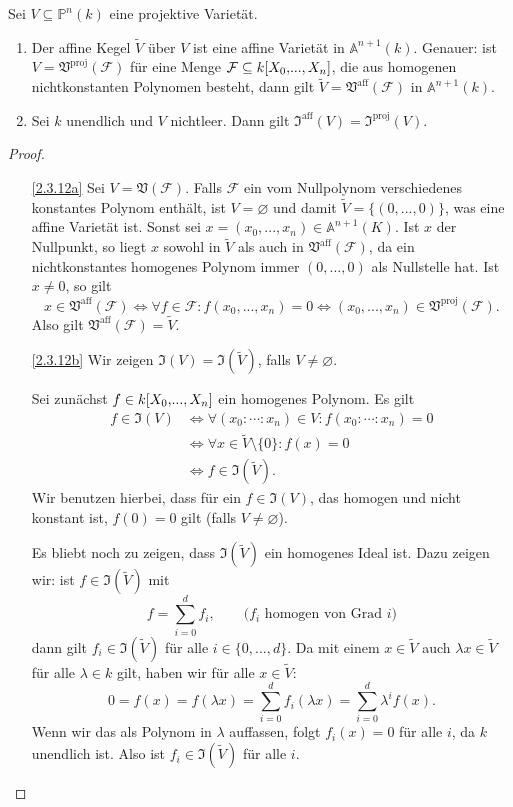\documentclass[a4paper,12pt]{scrbook}
\theoremstyle{keinenummern} %
\theoremstyle{mitnummern}
\theoremstyle{unserbeweis}
\newtheorem{proof}{Beweis}
\def\A{\mathbb{A}}
\def\V{\mathfrak{V}}
\def\I{\mathfrak{I}}
\def\P{\mathbb{P}}
\newcommand{\F}{\mathcal{F}}
\newcommand{\leer}{\ensuremath{\varnothing}}
\renewcommand{\dotsc}{\ensuremath{\!...}}
\newcommand{\ppolyx}[1][n]{\ensuremath%
  [X_{0},\dotsc,X_{#1}]}
\begin{document}
\begin{prop}\label{2.3.12prop}
  Sei $V\subseteq\P^n(k)$ eine projektive Varietät.
  \begin{enumerate}
  \item{} Der affine Kegel $\tilde{V}$ über $V$ ist eine affine Varietät in $\A^{n+1}(k)$. Genauer: ist
    $V=\V^{\mathrm{proj}}(\F)$ für eine Menge $\F\subseteq k\ppolyx$, die aus homogenen nichtkonstanten Polynomen besteht, dann
    gilt $\tilde{V}=\V^{\mathrm{aff}}(\F)$ in $\A^{n+1}(k)$.
  \item{} Sei $k$ unendlich und $V$ nichtleer. Dann gilt $\I^{\mathrm{aff}}(V)=\I^{\mathrm{proj}}(V)$.
  \end{enumerate}
\end{prop}
\begin{proof}
  \begin{enumerate}
  \item[\ref{2.3.12a}] Sei $V=\V(\F)$. Falls $\F$ ein vom Nullpolynom verschiedenes konstantes Polynom enthält, ist $V=\leer$
    und damit $\tilde{V}=\{(0,\dotsc,0)\}$, was eine affine Varietät ist. Sonst sei $x=(x_0,\dotsc,x_n)\in\A^{n+1}(K)$. Ist $x$
    der Nullpunkt, so liegt $x$ sowohl in $\tilde{V}$ als auch in $\V^{\mathrm{aff}}(\F)$, da ein nichtkonstantes homogenes
    Polynom immer $(0,\dotsc,0)$ als Nullstelle hat. Ist $x\neq0$, so gilt
    \[ x\in\V^{\mathrm{aff}}(\F) \iff \forall f\in\F\colon f(x_0,\dotsc,x_n)=0 \iff
    (x_0,\dotsc,x_n)\in\V^{\mathrm{proj}}(\F). \]
    Also gilt $\V^{\mathrm{aff}}(\F)=\tilde{V}$.
  \item[\ref{2.3.12b}] Wir zeigen $\I(V)=\I(\tilde{V})$, falls $V\neq\leer$.

    Sei zunächst $f\in k\ppolyx$ ein homogenes Polynom. Es gilt
    \begin{align*}
      f\in\I(V) &\iff \forall (x_0:\dotsm:x_n)\in V\colon f(x_0:\dotsm:x_n)=0 \\ &\iff \forall x\in\tilde{V}\setminus\{0\}\colon
      f(x)=0 \\ &\iff f\in\I(\tilde{V}).
    \end{align*}
    Wir benutzen hierbei, dass für ein $f\in\I(V)$, das homogen und nicht konstant ist, $f(0)=0$ gilt (falls $V\neq\leer$).

    Es bliebt noch zu zeigen, dass $\I(\tilde{V})$ ein homogenes Ideal ist. Dazu zeigen wir: ist $f\in\I(\tilde{V})$ mit
    \[ f=\sum_{i=0}^d f_i, \qquad \text{(}f_i\text{ homogen von Grad }i\text{)} \] dann gilt $f_i\in\I(\tilde{V})$ für alle
    $i\in\{0,\dotsc,d\}$. Da mit einem $x\in\tilde{V}$ auch $\lambda x\in\tilde{V}$ für alle $\lambda\in k$ gilt, haben wir für
    alle $x\in\tilde{V}$: \[ 0=f(x)=f(\lambda x)=\sum_{i=0}^d f_i(\lambda x) = \sum_{i=0}^d \lambda^i f(x). \] Wenn wir das als
    Polynom in $\lambda$ auffassen, folgt $f_i(x)=0$ für alle $i$, da $k$ unendlich ist. Also ist $f_i\in\I(\tilde{V})$ für alle $i$.
  \end{enumerate}
\end{proof}
\end{document}
